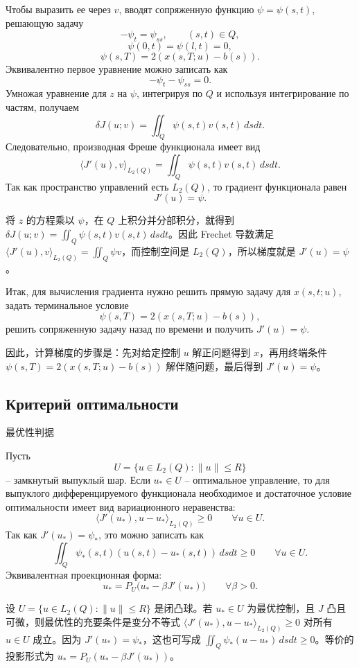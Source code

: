 \documentclass[12pt,a4paper]{article}
\newcommand{\zh}[1]{\par\noindent #1\par}
\begin{document}
Чтобы выразить ее через \(v\), вводят сопряженную функцию \(\psi=\psi(s,t)\), решающую задачу
\[
-\psi_t=\psi_{ss},
\qquad (s,t)\in Q,
\]
\[
\psi(0,t)=\psi(l,t)=0,
\]
\[
\psi(s,T)=2(x(s,T;u)-b(s)).
\]
Эквивалентно первое уравнение можно записать как
\[
-\psi_t-\psi_{ss}=0.
\]
Умножая уравнение для \(z\) на \(\psi\), интегрируя по \(Q\) и используя интегрирование по частям, получаем
\[
\delta J(u;v)=
\iint_Q \psi(s,t)v(s,t)\,dsdt.
\]
Следовательно, производная Фреше функционала имеет вид
\[
\langle J'(u),v\rangle_{L_2(Q)}=
\iint_Q \psi(s,t)v(s,t)\,dsdt.
\]
Так как пространство управлений есть \(L_2(Q)\), то градиент функционала равен
\[
J'(u)=\psi.
\]
\zh{将 \(z\) 的方程乘以 \(\psi\)，在 \(Q\) 上积分并分部积分，就得到 \(\delta J(u;v)=\iint_Q\psi(s,t)v(s,t)\,dsdt\)。因此 Frechet 导数满足 \(\langle J'(u),v\rangle_{L_2(Q)}=\iint_Q\psi v\)，而控制空间是 \(L_2(Q)\)，所以梯度就是 \(J'(u)=\psi\)。}

Итак, для вычисления градиента нужно решить прямую задачу для \(x(s,t;u)\), задать терминальное условие
\[
\psi(s,T)=2(x(s,T;u)-b(s)),
\]
решить сопряженную задачу назад по времени и получить \(J'(u)=\psi\).
\zh{因此，计算梯度的步骤是：先对给定控制 \(u\) 解正问题得到 \(x\)，再用终端条件 \(\psi(s,T)=2(x(s,T;u)-b(s))\) 解伴随问题，最后得到 \(J'(u)=\psi\)。}

\subsection*{Критерий оптимальности}
\zh{最优性判据}
Пусть
\[
U=\{u\in L_2(Q):\|u\|\le R\}
\]
-- замкнутый выпуклый шар. Если \(u_*\in U\) -- оптимальное управление, то для выпуклого дифференцируемого функционала необходимое и достаточное условие оптимальности имеет вид вариационного неравенства:
\[
\langle J'(u_*),u-u_*\rangle_{L_2(Q)}\ge0
\qquad \forall u\in U.
\]
Так как \(J'(u_*)=\psi_*\), это можно записать как
\[
\iint_Q \psi_*(s,t)(u(s,t)-u_*(s,t))\,dsdt\ge0
\qquad \forall u\in U.
\]
Эквивалентная проекционная форма:
\[
u_*=P_U\bigl(u_* -\beta J'(u_*)\bigr)
\qquad \forall \beta>0.
\]
\zh{设 \(U=\{u\in L_2(Q):\|u\|\le R\}\) 是闭凸球。若 \(u_*\in U\) 为最优控制，且 \(J\) 凸且可微，则最优性的充要条件是变分不等式 \(\langle J'(u_*),u-u_*\rangle_{L_2(Q)}\ge0\) 对所有 \(u\in U\) 成立。因为 \(J'(u_*)=\psi_*\)，这也可写成 \(\iint_Q\psi_*(u-u_*)\,dsdt\ge0\)。等价的投影形式为 \(u_*=P_U(u_*-\beta J'(u_*))\)。}

\end{document}
